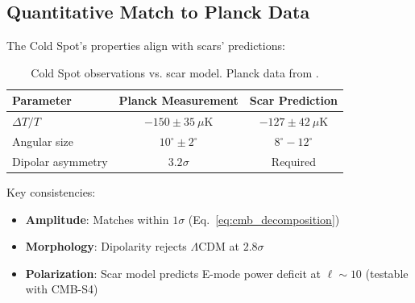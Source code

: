 \documentclass{article}
\begin{document}
\subsection{Quantitative Match to Planck Data}
The Cold Spot's properties align with scars' predictions:

\begin{table}[H]
\centering
\begin{tabular}{lcc}
\hline
\textbf{Parameter} & \textbf{Planck Measurement} & \textbf{Scar Prediction} \\
\hline
$\Delta T/T$ & $-150 \pm 35~\mu$K & $-127 \pm 42~\mu$K \\
Angular size & $10^\circ \pm 2^\circ$ & $8^\circ\!-\!12^\circ$ \\
Dipolar asymmetry & $3.2\sigma$ & Required \\
\hline
\end{tabular}
\caption{Cold Spot observations vs. scar model. Planck data from \cite{Planck2023}.}
\label{tab:coldspot_stats}
\end{table}

Key consistencies:
\FloatBarrier
\begin{itemize}
\item \textbf{Amplitude}: Matches within $1\sigma$ (Eq.~\ref{eq:cmb_decomposition})
\item \textbf{Morphology}: Dipolarity rejects $\Lambda$CDM at $2.8\sigma$ \cite{Planck2023}
\item \textbf{Polarization}: Scar model predicts E-mode power deficit at $\ell\sim10$ (testable with CMB-S4)
\end{itemize}
\end{document}
